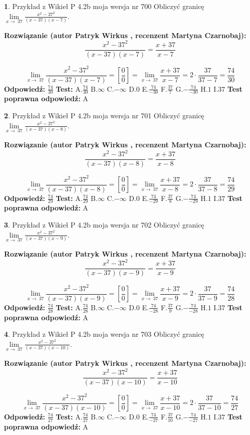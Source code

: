 \documentclass[12pt, a4paper]{article}
\theoremstyle{definition} %
\newtheorem{zad}{}
\newcommand{\zadStart}[1]{\begin{zad}#1\newline}
\newcommand{\zadStop}{\end{zad}}
\newcommand{\rozwStart}[2]{\noindent \textbf{Rozwiązanie (autor #1 , recenzent #2): }\newline}
\newcommand{\rozwStop}{\newline}
\newcommand{\odpStart}{\noindent \textbf{Odpowiedź:}\newline}
\newcommand{\odpStop}{\newline}
\newcommand{\testStart}{\noindent \textbf{Test:}\newline}
\newcommand{\testStop}{\newline}
\newcommand{\kluczStart}{\noindent \textbf{Test poprawna odpowiedź:}\newline}
\newcommand{\kluczStop}{\newline}
\begin{document}
\zadStart{Przykład z Wikieł P 4.2b moja wersja nr 700}
Obliczyć granicę $\lim\limits_{x\to\ 37}\frac{x^{2}-37^{2}}{(x-37)(x-7)}$.
\zadStop
\rozwStart{Patryk Wirkus}{Martyna Czarnobaj}
$$\frac{x^{2}-37^{2}}{(x-37)(x-7)}=\frac{x+37}{x-7}$$

$$\lim\limits_{x\to\ 37}\frac{x^{2}-37^{2}}{(x-37)(x-7)}=[\frac{0}{0}]=\lim\limits_{x\to\ 37}\frac{x+37}{x-7}=2 \cdot \frac{37}{37-7} = \frac{74}{30}$$
\rozwStop
\odpStart
$\frac{74}{30}$
\odpStop
\testStart
A.$\frac{74}{30}$
B.$\infty$
C.$-\infty$
D.$0$
E.$\frac{74}{-30}$
F.$\frac{37}{7}$
G.$-\frac{74}{-30}$
H.$1$
I.$37$
\testStop
\kluczStart
A
\kluczStop



\zadStart{Przykład z Wikieł P 4.2b moja wersja nr 701}
Obliczyć granicę $\lim\limits_{x\to\ 37}\frac{x^{2}-37^{2}}{(x-37)(x-8)}$.
\zadStop
\rozwStart{Patryk Wirkus}{Martyna Czarnobaj}
$$\frac{x^{2}-37^{2}}{(x-37)(x-8)}=\frac{x+37}{x-8}$$

$$\lim\limits_{x\to\ 37}\frac{x^{2}-37^{2}}{(x-37)(x-8)}=[\frac{0}{0}]=\lim\limits_{x\to\ 37}\frac{x+37}{x-8}=2 \cdot \frac{37}{37-8} = \frac{74}{29}$$
\rozwStop
\odpStart
$\frac{74}{29}$
\odpStop
\testStart
A.$\frac{74}{29}$
B.$\infty$
C.$-\infty$
D.$0$
E.$\frac{74}{-29}$
F.$\frac{37}{8}$
G.$-\frac{74}{-29}$
H.$1$
I.$37$
\testStop
\kluczStart
A
\kluczStop



\zadStart{Przykład z Wikieł P 4.2b moja wersja nr 702}
Obliczyć granicę $\lim\limits_{x\to\ 37}\frac{x^{2}-37^{2}}{(x-37)(x-9)}$.
\zadStop
\rozwStart{Patryk Wirkus}{Martyna Czarnobaj}
$$\frac{x^{2}-37^{2}}{(x-37)(x-9)}=\frac{x+37}{x-9}$$

$$\lim\limits_{x\to\ 37}\frac{x^{2}-37^{2}}{(x-37)(x-9)}=[\frac{0}{0}]=\lim\limits_{x\to\ 37}\frac{x+37}{x-9}=2 \cdot \frac{37}{37-9} = \frac{74}{28}$$
\rozwStop
\odpStart
$\frac{74}{28}$
\odpStop
\testStart
A.$\frac{74}{28}$
B.$\infty$
C.$-\infty$
D.$0$
E.$\frac{74}{-28}$
F.$\frac{37}{9}$
G.$-\frac{74}{-28}$
H.$1$
I.$37$
\testStop
\kluczStart
A
\kluczStop



\zadStart{Przykład z Wikieł P 4.2b moja wersja nr 703}
Obliczyć granicę $\lim\limits_{x\to\ 37}\frac{x^{2}-37^{2}}{(x-37)(x-10)}$.
\zadStop
\rozwStart{Patryk Wirkus}{Martyna Czarnobaj}
$$\frac{x^{2}-37^{2}}{(x-37)(x-10)}=\frac{x+37}{x-10}$$

$$\lim\limits_{x\to\ 37}\frac{x^{2}-37^{2}}{(x-37)(x-10)}=[\frac{0}{0}]=\lim\limits_{x\to\ 37}\frac{x+37}{x-10}=2 \cdot \frac{37}{37-10} = \frac{74}{27}$$
\rozwStop
\odpStart
$\frac{74}{27}$
\odpStop
\testStart
A.$\frac{74}{27}$
B.$\infty$
C.$-\infty$
D.$0$
E.$\frac{74}{-27}$
F.$\frac{37}{10}$
G.$-\frac{74}{-27}$
H.$1$
I.$37$
\testStop
\kluczStart
A
\kluczStop
\end{document}
